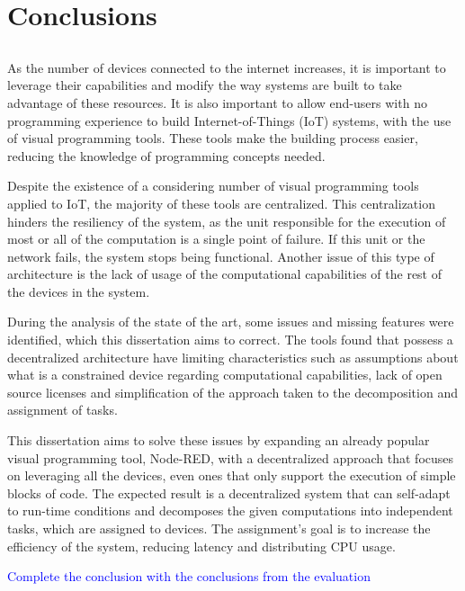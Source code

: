 \chapter{Conclusions} \label{chap:concl} \minitoc

\section*{}


As the number of devices connected to the internet increases, it is important to leverage their capabilities and modify the way systems are built to take advantage of these resources. It is also important to allow end-users with no programming experience to build Internet-of-Things (IoT) systems, with the use of visual programming tools. These tools make the building process easier, reducing the knowledge of programming concepts needed.

Despite the existence of a considering number of visual programming tools applied to IoT, the majority of these tools are centralized. This centralization hinders the resiliency of the system, as the unit responsible for the execution of most or all of the computation is a single point of failure. If this unit or the network fails, the system stops being functional. Another issue of this type of architecture is the lack of usage of the computational capabilities of the rest of the devices in the system.

During the analysis of the state of the art, some issues and missing features were identified, which this dissertation aims to correct. The tools found that possess a decentralized architecture have limiting characteristics such as assumptions about what is a constrained device regarding computational capabilities, lack of open source licenses and simplification of the approach taken to the decomposition and assignment of tasks.

This dissertation aims to solve these issues by expanding an already popular visual programming tool, Node-RED, with a decentralized approach that focuses on leveraging all the devices, even ones that only support the execution of simple blocks of code. The expected result is a decentralized system that can self-adapt to run-time conditions and decomposes the given computations into independent tasks, which are assigned to devices. The assignment's goal is to increase the efficiency of the system, reducing latency and distributing CPU usage.  

\textcolor{blue}{Complete the conclusion with the conclusions from the evaluation}


